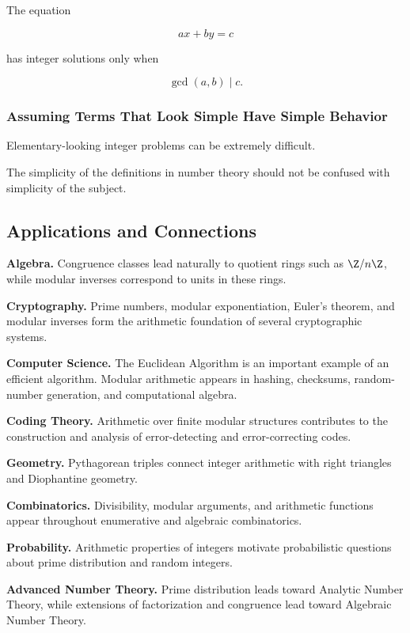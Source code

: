 The equation

\[ ax+by=c \]

has integer solutions only when

\[ \gcd(a,b)\mid c. \]

\subsubsection{Assuming Terms That Look Simple Have Simple Behavior}

Elementary-looking integer problems can be extremely difficult.

The simplicity of the definitions in number theory should not be confused
with simplicity of the subject.

\subsection{Applications and Connections}
\label{subsec:elementary-number-theory-applications}

\begin{applicationbox}
\textbf{Algebra.}
Congruence classes lead naturally to quotient rings such as
\(\Z/n\Z\), while modular inverses correspond to units in these rings.

\medskip

\textbf{Cryptography.}
Prime numbers, modular exponentiation, Euler's theorem, and modular inverses
form the arithmetic foundation of several cryptographic systems.

\medskip

\textbf{Computer Science.}
The Euclidean Algorithm is an important example of an efficient algorithm.
Modular arithmetic appears in hashing, checksums, random-number generation,
and computational algebra.

\medskip

\textbf{Coding Theory.}
Arithmetic over finite modular structures contributes to the construction
and analysis of error-detecting and error-correcting codes.

\medskip

\textbf{Geometry.}
Pythagorean triples connect integer arithmetic with right triangles and
Diophantine geometry.

\medskip

\textbf{Combinatorics.}
Divisibility, modular arguments, and arithmetic functions appear throughout
enumerative and algebraic combinatorics.

\medskip

\textbf{Probability.}
Arithmetic properties of integers motivate probabilistic questions about
prime distribution and random integers.

\medskip

\textbf{Advanced Number Theory.}
Prime distribution leads toward Analytic Number Theory, while extensions of
factorization and congruence lead toward Algebraic Number Theory.
\end{applicationbox}

